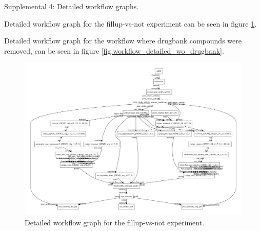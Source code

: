 \documentclass[utf8]{frontiersSCNS} %
\begin{document}
Supplemental 4: Detailed workflow graphs.

Detailed workflow graph for the fillup-vs-not experiment can be seen in figure
\ref{fig:workflow_detailed_fillup_vs_not}.

Detailed workflow graph for the workflow where drugbank compounds were removed,
can be seen in figure \ref{fig:workflow_detailed_wo_drugbank}.

\begin{figure}[h!]
\includegraphics[width=\textwidth]{figures/workflow_graph_fillup_vs_not.pdf}
    \caption{Detailed workflow graph for the fillup-vs-not experiment.}
    \label{fig:workflow_detailed_fillup_vs_not}
\end{figure}
\end{document}
